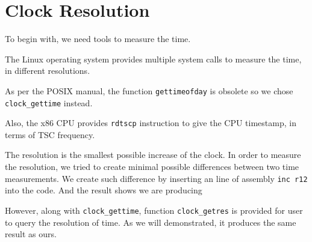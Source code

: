 \section{Clock Resolution}

To begin with, we need tools to measure the time.

The Linux operating system provides multiple system calls to measure the time, in different resolutions.

As per the POSIX manual\cite{posix_clock_gettime}, the function \texttt{gettimeofday} is obsolete so we chose \texttt{clock\_gettime} instead.

Also, the x86 CPU provides \texttt{rdtscp} instruction to give the CPU timestamp, in terms of TSC frequency.

The resolution is the smallest possible increase of the clock. In order to measure the resolution, we tried to create minimal possible differences between two time measurements. We create such difference by inserting an line of assembly \texttt{inc r12} into the code. And the result shows we are producing

However, along with \texttt{clock\_gettime}, function \texttt{clock\_getres} is provided for user to query the resolution of time. As we will demonstrated, it produces the same result as ours.